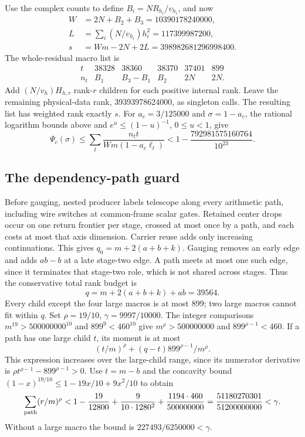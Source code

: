 Use the complex counts to define $B_i=NR_{h_i}/v_{h_i}$, and now
\[
\begin{aligned}
W&=2N+B_2+B_3=10390178240000,\\
L&=\sum_i(N/v_{h_i})h_i^2=117399987200,\\
s&=Wm-2N+2L=398982681296998400.
\end{aligned}
\]
The whole-residual macro list is
\[
\begin{array}{c|rrrrr}
t&38328&38360&38370&37401&899\\\hline
n_t&B_1&B_3-B_1&B_2&2N&2N.
\end{array}
\]
Add $(N/v_h)H_{h,r}$ rank-$r$ children for each positive internal rank.
Leave the remaining physical-data rank, 39393978624000, as singleton
calls. The resulting list has weighted rank exactly $s$.
For $a_c=3/125000$ and $\sigma=1-a_c$, the rational logarithm bounds
above and $e^u\le(1-u)^{-1}$, $0\le u<1$, give
\[
 \Psi_c(\sigma)\le\sum_t\frac{n_tt}{Wm(1-a_c\ell_t)}
 <1-\frac{792981575160764}{10^{23}}.
\]

\subsection{The dependency-path guard}
Before gauging, nested producer labels telescope along every arithmetic
path, including wire switches at common-frame scalar gates. Retained
center drops occur on one return frontier per stage, crossed at most
once by a path, and each costs at most that axis dimension. Carrier
reuse adds only increasing continuations. This gives
$q_0=m+2(a+b+k)$. Gauging removes an early edge and adds $ab-b$ at
a late stage-two edge. A path meets at most one such edge, since it
terminates that stage-two role, which is not shared across stages.
Thus the conservative total rank budget is
\[
 q=m+2(a+b+k)+ab=39564.
\]
Every child except the four large macros is at most 899; two large
macros cannot fit within $q$. Set $\rho=19/10$, $\gamma=9997/10000$.
The integer comparisons $m^{19}>500000000^{10}$ and
$899^9<460^{10}$ give $m^\rho>500000000$ and
$899^{\rho-1}<460$.
If a path has one large child $t$, its moment is at most
\[
 (t/m)^\rho+(q-t)899^{\rho-1}/m^\rho.
\]
This expression increases over the large-child range, since its
numerator derivative is $\rho t^{\rho-1}-899^{\rho-1}>0$.
Use $t=m-b$ and the concavity bound
$(1-x)^{19/10}\le1-19x/10+9x^2/10$ to obtain
\[
 \sum_{\rm path}(r/m)^\rho
 <1-\frac{19}{12800}+\frac9{10\cdot1280^2}
       +\frac{1194\cdot460}{500000000}
 =\frac{51180270301}{51200000000}<\gamma.
\]
Without a large macro the bound is $227493/6250000<\gamma$.

